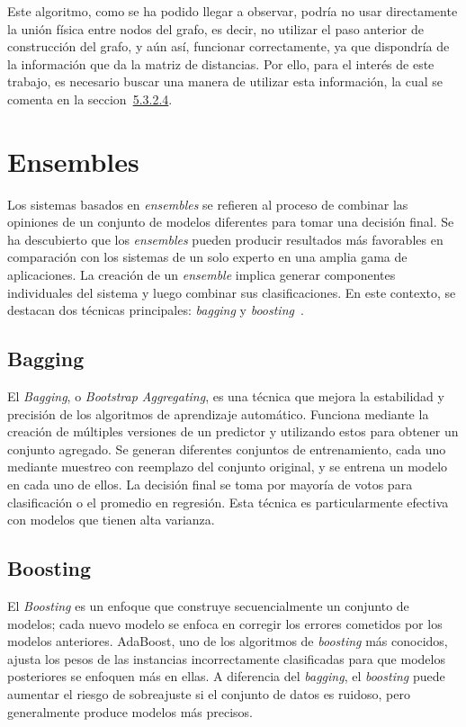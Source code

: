 Este algoritmo, como se ha podido llegar a observar, podría no usar directamente la unión física entre nodos del grafo, es decir, no utilizar el paso anterior de construcción del grafo, y aún así, funcionar correctamente, ya que dispondría de la información que da la matriz de distancias. Por ello, para el interés de este trabajo, es necesario buscar una manera de utilizar esta información, la cual se comenta en la seccion~\hyperref[sec5:LGC]{5.3.2.4}.
\clearpage
\section{Ensembles}
Los sistemas basados en \textit{ensembles} se refieren al proceso de combinar las opiniones de un conjunto de modelos diferentes para tomar una decisión final. Se ha descubierto que los \textit{ensembles} pueden producir resultados más favorables en comparación con los sistemas de un solo experto en una amplia gama de aplicaciones. La creación de un \textit{ensemble} implica generar componentes individuales del sistema y luego combinar sus clasificaciones. En este contexto, se destacan dos técnicas principales: \textit{bagging} y \textit{boosting}~\cite{ensembles}.

\subsection{Bagging}
El \textit{Bagging}, o \textit{Bootstrap Aggregating}, es una técnica que mejora la estabilidad y precisión de los algoritmos de aprendizaje automático. Funciona mediante la creación de múltiples versiones de un predictor y utilizando estos para obtener un conjunto agregado. Se generan diferentes conjuntos de entrenamiento, cada uno mediante muestreo con reemplazo del conjunto original, y se entrena un modelo en cada uno de ellos. La decisión final se toma por mayoría de votos para clasificación o el promedio en regresión. Esta técnica es particularmente efectiva con modelos que tienen alta varianza.

\subsection{Boosting}
El \textit{Boosting} es un enfoque que construye secuencialmente un conjunto de modelos; cada nuevo modelo se enfoca en corregir los errores cometidos por los modelos anteriores. AdaBoost, uno de los algoritmos de \textit{boosting} más conocidos, ajusta los pesos de las instancias incorrectamente clasificadas para que modelos posteriores se enfoquen más en ellas. A diferencia del \textit{bagging}, el \textit{boosting} puede aumentar el riesgo de sobreajuste si el conjunto de datos es ruidoso, pero generalmente produce modelos más precisos.


